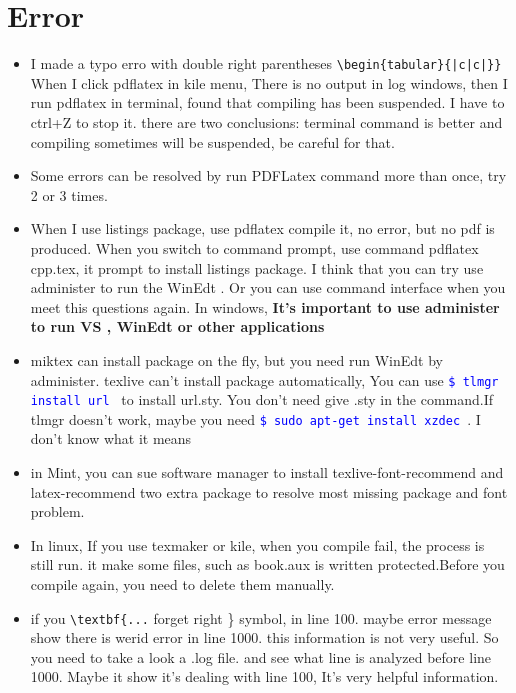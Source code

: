 \documentclass[a4paper,12pt,twoside]{book}
\newcommand{\linuxcommand}[1]{\texttt{\textcolor{blue}{\$ #1 \Pisymbol{psy}{191}}}}
\begin{document}
\section{Error}
\begin{itemize}
 \item I made a typo erro with double right parentheses \verb=\begin{tabular}{|c|c|}}=
  When I click pdflatex in kile menu, There is no output in log windows, then I run pdflatex in terminal,
  found that compiling has been suspended. I have to ctrl+Z to stop it. there are two conclusions: terminal command is better and compiling sometimes will be suspended, be careful for that.
 \item Some errors can be resolved by run PDFLatex command more than once, try 2 or 3 times.
 \item When I use listings package, use pdflatex compile it, no error, but no pdf is produced. When you switch to command prompt, use command pdflatex cpp.tex, it prompt to install listings package. I think that you can try use administer to run the WinEdt . Or you can use command interface when you meet this questions again. In windows, \textbf{It's important to use administer to run VS , WinEdt  or other applications}
\item miktex can install package on the fly, but you need run WinEdt by administer. texlive can't install package automatically, You can use \linuxcommand{tlmgr install url} to install url.sty. You don't need give .sty in the command.If tlmgr doesn't work,  maybe you need \linuxcommand{sudo apt-get install xzdec}. I don't know what it means
    \item  in Mint, you can sue software manager to install texlive-font-recommend and latex-recommend two extra package to resolve most missing package and font problem.
    \item In linux, If you use texmaker or kile, when you compile fail,  the process is still run. it make some files, such as  book.aux is written protected.Before you compile again, you need to delete them manually.
    \item if you \verb=\textbf{...= forget right \} symbol, in line 100. maybe error message show there is werid error in line 1000. this information is not very useful. So you need to take a look a .log file. and see what line is analyzed  before line 1000. Maybe it show it's dealing with line 100, It's very helpful information. 
\end{itemize}



\ifx \allfiles \undefined

\end{document}
